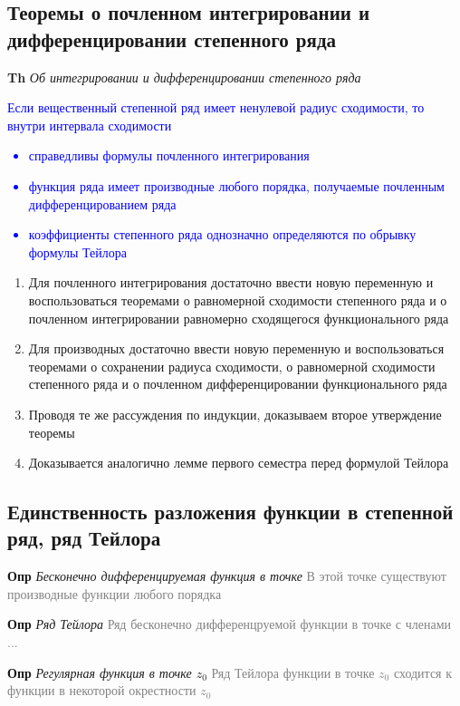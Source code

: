 \subsection{Теоремы о почленном интегрировании и дифференцировании степенного ряда}

\textbf{Th} \textit{Об интегрировании и дифференцировании степенного ряда}

\textcolor{blue}{Если вещественный степенной ряд имеет ненулевой радиус сходимости, то внутри интервала
сходимости
    \begin{itemize}
        \item справедливы формулы почленного интегрирования
        \item функция ряда имеет производные любого порядка, получаемые почленным дифференцированием ряда
        \item коэффициенты степенного ряда однозначно определяются по обрывку формулы Тейлора
    \end{itemize}   }

\begin{enumerate}
    \item Для почленного интегрирования достаточно ввести новую переменную и воспользоваться теоремами о
    равномерной сходимости степенного ряда и о почленном интегрировании равномерно сходящегося функционального ряда
    \item Для производных достаточно ввести новую переменную и воспользоваться теоремами о сохранении радиуса
    сходимости, о равномерной сходимости степенного ряда и о почленном дифференцировании функционального ряда
    \item Проводя те же рассуждения по индукции, доказываем второе утверждение теоремы
    \item Доказывается аналогично лемме первого семестра перед формулой Тейлора
\end{enumerate}

\subsection{Единственность разложения функции в степенной ряд, ряд Тейлора}

\textbf{Опр} \textit{Бесконечно дифференцируемая функция в точке} \textcolor{gray}{В этой точке существуют
производные функции любого порядка}

\textbf{Опр} \textit{Ряд Тейлора} \textcolor{gray}{Ряд бесконечно дифференцруемой функции в точке с членами ...}

\textbf{Опр} \textit{Регулярная функция в точке $z_0$} \textcolor{gray}{Ряд Тейлора функции в точке $z_0$
    сходится к функции в некоторой окрестности $z_0$}

